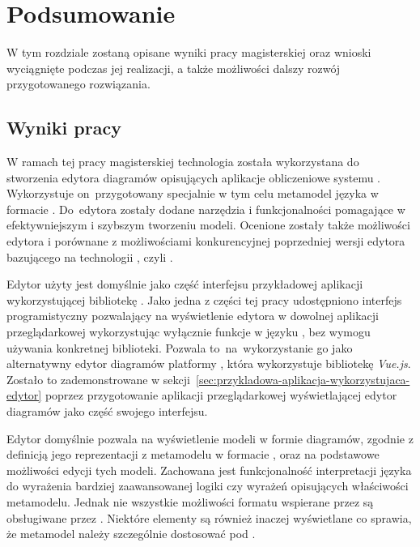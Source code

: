 \chapter{Podsumowanie}

W tym rozdziale zostaną opisane wyniki pracy magisterskiej oraz wnioski
wyciągnięte podczas jej realizacji, a także możliwości dalszy rozwój
przygotowanego rozwiązania.

\section{Wyniki pracy}

W ramach tej pracy magisterskiej technologia \SiriusWeb{} została
wykorzystana do stworzenia edytora diagramów opisujących aplikacje obliczeniowe
systemu \BalticLSC{}. Wykorzystuje on~przygotowany specjalnie w tym celu
metamodel języka \CAL{} w formacie \Ecore{}. Do~edytora zostały dodane
narzędzia i
funkcjonalności pomagające w efektywniejszym i szybszym tworzeniu modeli.
Ocenione zostały także możliwości edytora i porównane z możliwościami
konkurencyjnej poprzedniej wersji edytora bazującego na technologii \EMF{},
czyli \SiriusDesktop{}.

Edytor użyty jest domyślnie jako część interfejsu przykładowej aplikacji
wykorzystującej bibliotekę \React{}.
Jako jedna z części tej pracy udostępniono interfejs programistyczny
pozwalający na wyświetlenie edytora w dowolnej aplikacji przeglądarkowej
wykorzystując wyłącznie funkcje w języku \JavaScript{}, bez wymogu używania
konkretnej biblioteki.
Pozwala to~na~wykorzystanie go jako
alternatywny edytor diagramów platformy \BalticLSC{}, która wykorzystuje
bibliotekę \emph{Vue.js}. Zostało to
zademonstrowane w sekcji~\ref{sec:przykladowa-aplikacja-wykorzystujaca-edytor}
poprzez przygotowanie aplikacji przeglądarkowej wyświetlającej
edytor diagramów jako część swojego interfejsu.

Edytor domyślnie pozwala na wyświetlenie modeli w formie diagramów, zgodnie z
definicją jego reprezentacji z metamodelu w formacie \Ecore{}, oraz na
podstawowe możliwości
edycji tych modeli. Zachowana jest funkcjonalność interpretacji języka
 do wyrażenia bardziej zaawansowanej logiki czy wyrażeń
opisujących
właściwości metamodelu. Jednak nie wszystkie możliwości formatu \Ecore{}
wspierane przez \SiriusDesktop{} są obsługiwane przez \SiriusWeb{}.
Niektóre elementy są również inaczej wyświetlane co sprawia, że metamodel
należy szczególnie dostosować pod \SiriusWeb{}.

